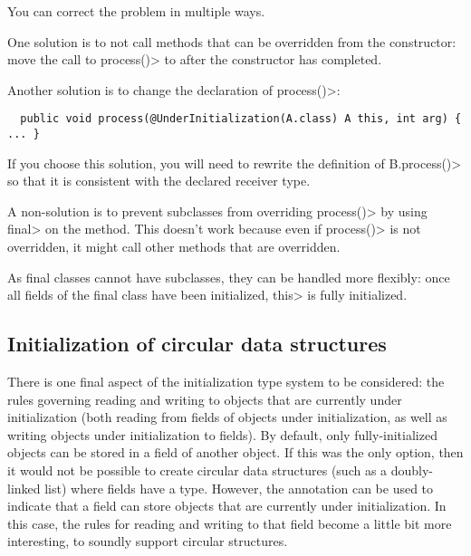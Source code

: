 You can correct the problem in multiple ways.

One solution is to not call methods that can be overridden from the
constructor:  move the call to \<process()> to after the constructor has
completed.

Another solution is to change the declaration of \<process()>:

\begin{Verbatim}
  public void process(@UnderInitialization(A.class) A this, int arg) { ... }
\end{Verbatim}

If you choose this solution, you will need to rewrite the definition of
\<B.process()> so that it is consistent with the declared receiver type.

A non-solution is to prevent subclasses from overriding \<process()> by
using \<final> on the method.  This doesn't work because even if
\<process()> is not overridden, it might call other methods that are
overridden.

As final classes cannot have subclasses, they can be handled more
flexibly: once all fields of the final class have been
initialized, \<this> is fully initialized.




\subsection{Initialization of circular data structures\label{circular-initialization}}

There is one final aspect of the initialization type system to be
considered:  the rules governing reading and writing to objects that are
currently under initialization (both reading from fields of objects under
initialization, as well as writing objects under initialization to fields).
By default, only fully-initialized objects can be stored in a field of
another object.  If this was the only option, then it would not be possible
to create circular data structures (such as a doubly-linked list) where
fields have a  type.  However,
the annotation
 can be used to
indicate that a field can store objects that are currently under initialization.
In this case, the rules for reading and writing to that field become a little
bit more interesting, to soundly support circular structures.

